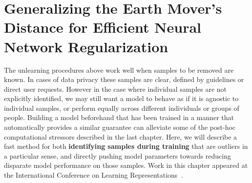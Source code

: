 \chapter{Generalizing the Earth Mover's Distance for Efficient Neural Network Regularization}\label{chap:demd}

The unlearning procedures above work well
when samples to be removed are known.
In cases of data privacy these samples are clear,
defined by guidelines or direct user requests.
However in the case where individual
samples are not explicitly identified,
we may still want a model to behave as if
it is agnostic to individual samples,
or perform equally across different individuals
or groups of people. Building a model
beforehand that has been trained in a manner
that automatically provides a similar guarantee
can alleviate some of the post-hoc
computational stressors described in the last chapter.
Here, we will describe a fast method
for both \textbf{identifying samples during training}
that are outliers in a particular sense,
and directly pushing model parameters
towards reducing disparate model performance
on those samples.
Work in this chapter appeared at the International
Conference on Learning Representations~\citep{demd}.






